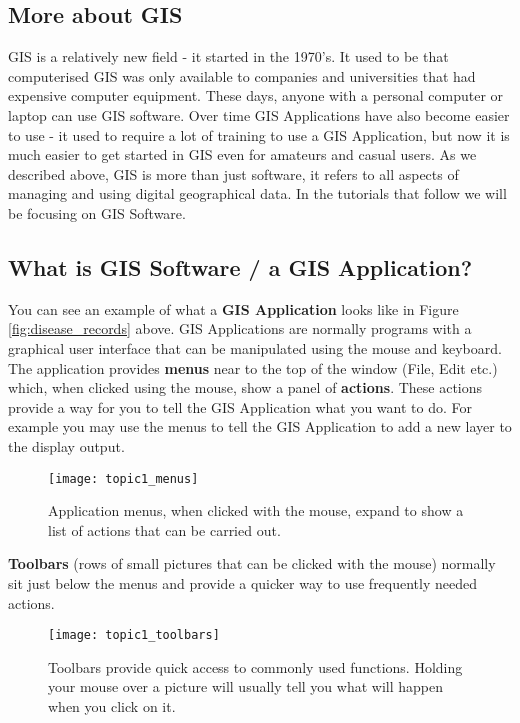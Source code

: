 \subsection{More about GIS}\label{subsec:moreaboutGIS}

GIS is a relatively new field - it started in the 1970's. It used to be that
computerised GIS was only available to companies and universities that had
expensive computer equipment. These days, anyone with a personal computer or
laptop can use GIS software. Over time GIS Applications have also become
easier to use - it used to require a lot of training to use a GIS
Application, but now it is much easier to get started in GIS even for
amateurs and casual users. As we described above, GIS is more than just
software, it refers to all aspects of managing and using digital geographical
data. In the tutorials that follow we will be focusing on GIS Software.

\subsection{What is GIS Software / a GIS Application?}\label{subsec:whatisGIS}

You can see an example of what a \textbf{GIS Application} looks like in
Figure \ref{fig:disease_records} above. GIS Applications are normally
programs with a graphical user interface that can be manipulated using the
mouse and keyboard. The application provides \textbf{menus} near to the top
of the window (File, Edit etc.) which, when clicked using the mouse, show a
panel of \textbf{actions}. These actions provide a way for you to tell the
GIS Application what you want to do. For example you may use the menus to
tell the GIS Application to add a new layer to the display output.

\begin{figure}[ht]
   \begin{center}
   \caption{Application menus, when clicked with the mouse, expand to show a
   list of actions that can be carried out.}
   \label{fig:application_menu}\smallskip
   \texttt{[image: topic1\_menus]}
\end{center}
\end{figure}

\textbf{Toolbars} (rows of small pictures that can be clicked with the mouse)
normally sit just below the menus and provide a quicker way to use frequently
needed actions.

\begin{figure}[ht]
   \begin{center}
   \caption{Toolbars provide quick access to commonly used functions. Holding
    your mouse over a picture will usually tell you what will happen when you
    click on it.}
   \label{fig:toolbars}\smallskip
   \texttt{[image: topic1\_toolbars]}
\end{center}
\end{figure}

